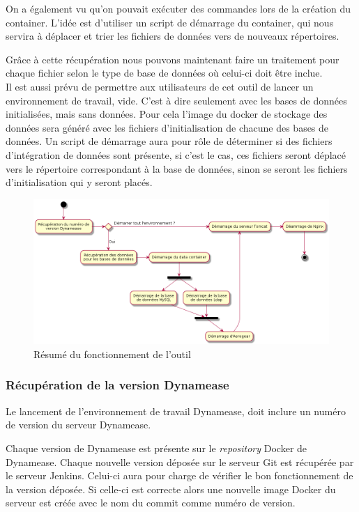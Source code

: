 On a également vu qu'on pouvait exécuter des commandes lors de la création du container. L'idée est d'utiliser un script de démarrage du container, qui nous servira à déplacer et trier les fichiers de données vers de nouveaux répertoires.

Grâce à cette récupération nous pouvons maintenant faire un traitement pour chaque fichier selon le type de base de données où celui-ci doit être inclue.\\

Il est aussi prévu de permettre aux utilisateurs de cet outil de lancer un environnement de travail, vide. C'est à dire seulement avec les bases de données initialisées, mais sans données. Pour cela l'image du docker de stockage des données sera généré avec les fichiers d'initialisation de chacune des bases de données. Un script de démarrage aura pour rôle de déterminer si des fichiers d'intégration de données sont présente, si c'est le cas, ces fichiers seront déplacé vers le répertoire correspondant à la base de données, sinon se seront les fichiers d'initialisation qui y seront placés. 

\begin{figure}[!h]
	\centering
	\includegraphics[scale=0.5]{img/activity_outil.png}
	\caption{\label{activity_outil} {Résumé du fonctionnement de l'outil}}
\end{figure}
\subsubsection{Récupération de la version Dynamease}

Le lancement de l'environnement de travail Dynamease, doit inclure un numéro de version du serveur Dynamease. 

Chaque version de Dynamease est présente sur le \textit{repository} Docker de Dynamease. Chaque nouvelle version déposée sur le serveur Git est récupérée par le serveur Jenkins. Celui-ci aura pour charge de vérifier le bon fonctionnement de la version déposée. Si celle-ci est correcte alors une nouvelle image Docker du serveur est créée avec le nom du commit comme numéro de version.


